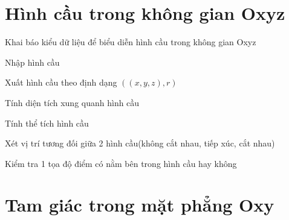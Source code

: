 \section{Hình cầu trong không gian Oxyz}

\begin{problem}
    Khai báo kiểu dữ liệu để biểu diễn hình cầu trong không gian Oxyz
\end{problem}
\begin{problem}
    Nhập hình cầu
\end{problem}
\begin{problem}
    Xuất hình cầu theo định dạng $((x, y, z), r)$
\end{problem}
\begin{problem}
    Tính diện tích xung quanh hình cầu
\end{problem}
\begin{problem}
    Tính thể tích hình cầu
\end{problem}
\begin{problem}
    Xét vị trí tương đối giữa 2 hình cầu(không cắt nhau, tiếp xúc, cắt nhau)
\end{problem}
\begin{problem}
    Kiểm tra 1 tọa độ điểm có nằm bên trong hình cầu hay không
\end{problem}


\section{Tam giác trong mặt phẳng Oxy}

